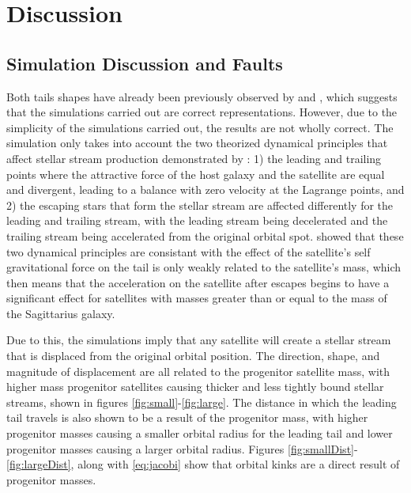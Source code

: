 \documentclass[twocolumn]{article}
\begin{document}
\section{Discussion}
\subsection{Simulation Discussion and Faults}
Both tails shapes have already been previously observed by \cite{grillmairDionatos} and \cite{leonCombes}, which suggests that the simulations carried out are correct representations. However, due to the simplicity of the simulations carried out, the results are not wholly correct. The simulation only takes into account the two theorized dynamical principles that affect stellar stream production demonstrated by \cite{ringsAndPseudoRings}: 1) the leading and trailing points where the attractive force of the host galaxy and the satellite are equal and divergent, leading to a balance with zero velocity at the Lagrange points, and 2) the escaping stars that form the stellar stream are affected differently for the leading and trailing stream, with the leading stream being decelerated and the trailing stream being accelerated from the original orbital spot. \cite{dynamicsOfTidalTails} showed that these two dynamical principles are consistant with the effect of the satellite's self gravitational force on the tail is only weakly related to the satellite's mass, which then means that the acceleration on the satellite after escapes begins to have a significant effect for satellites with masses greater than or equal to the mass of the Sagittarius galaxy. 

Due to this, the simulations imply that any satellite will create a stellar stream that is displaced from the original orbital position. The direction, shape, and magnitude of displacement are all related to the progenitor satellite mass, with higher mass progenitor satellites causing thicker and less tightly bound stellar streams, shown in figures \ref{fig:small}-\ref{fig:large}. The distance in which the leading tail travels is also shown to be a result of the progenitor mass, with higher progenitor masses causing a smaller orbital radius for the leading tail and lower progenitor masses causing a larger orbital radius. Figures \ref{fig:smallDist}-\ref{fig:largeDist}, along with \ref{eq:jacobi} show that orbital kinks are a direct result of progenitor masses. 
\end{document}
